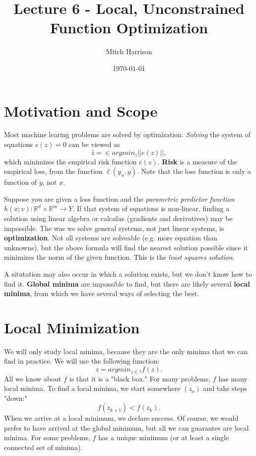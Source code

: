 \documentclass[titlepage, 12pt, leqno]{article}
\title{\Huge{Lecture 6 - Local, Unconstrained Function Optimization}}
\author{\large{Mitch Harrison}}
\date{\today}
\begin{document}
\setlength{\parskip}{1\baselineskip}
\setlength{\parindent}{15pt}
\maketitle
\tableofcontents
\newpage


\section{Motivation and Scope}

Most machine learing problems are solved by optimization. \textit{Solving} the
system of equations $e(z) = 0$ can be viewed as
\[
\hat z = \in argmin_{z}||e(z)||,
\]
which minimizes the empirical risk function $e(z)$. \textbf{Risk} is a measure of
the empirical loss, from the function $\ell(y_{n},y)$. Note that the loss
function is only a function of $y$, not $x$.

Suppose you are given a loss function and the \textit{parametric predictor 
function} $h(x;v) : \mathbb{R}^{d}\times \mathbb{R}^{m} \rightarrow Y$. If that
system of equations is non-linear, finding a solution using linear algebra or
calculus (gradients and derivatives) may be impossible. The was we solve general
systems, not just linear systems, is \textbf{optimization}. Not all systems are
solveable (e.g. more equation than unknowns), but the above formula will find the
nearest solution possible since it minimizes the norm of the given function. This
is the \textit{least squares solution.} 

A situtation may also occur in which a
solution exists, but we don't know how to find it. \textbf{Global minima} are
impossible to find, but there are likely several \textbf{local minima}, from which
we have several ways of selecting the best.

\pagebreak
\section{Local Minimization}
We will only study local minima, because they are the only minima that we can
find in practice. We will use the following function:
\[
    z = argmin_{z \in ?}f(z).
\]
All we know about $f$ is that it is a "black box." For many problems, $f$ has
many local minima. To find a local minima, we start somewhere $(z_{o})$ and take
steps "down:"
\[
    f(z_{k+1}) < f(z_{k}).
\]
When we arrive at a local minimum, we declare success. Of course, we would
prefer to have arrived at the global minimum, but all we can guarantee are
local minima. For some problems, $f$ has a unique minimum (or at least a single
connected set of minima).
\end{document}
